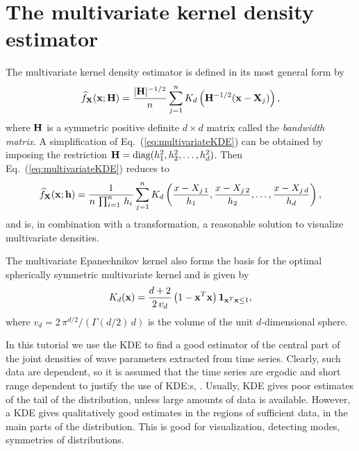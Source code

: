 \section{The multivariate kernel density estimator}
\label{sec:multivariateKDE}
The multivariate kernel density estimator is defined in its most
general form by
\begin{equation}
  \label{eq:multivariateKDE}
  \widehat{f}_{\mathbf{X} }(\mathbf{x} ;\mathbf{H} ) = \frac{|\mathbf{H} |^{-1/2}}{n}
 \sum_{j=1}^{n} K_{d}\left(\mathbf{H} ^{-1/2}(\mathbf{x} -\mathbf{X} _{j})\right),
\end{equation}
where $\mathbf{H} $ is a symmetric positive definite $d \times d$ matrix
called the \textit{bandwidth matrix}. 
A simplification of
Eq.~(\ref{eq:multivariateKDE}) can be obtained by imposing the
restriction $\mathbf{H}  = \text{diag}(h_{1}^{2}, h_{2}^{2}, \ldots ,
h_{d}^{2})$. Then Eq.~(\ref{eq:multivariateKDE}) reduces to
\begin{equation}
  \label{eq:multivariateKDE2}
  \widehat{f}_{\mathbf{X} }(\mathbf{x} ;\mathbf{h} ) =
  \frac{1}{n\,\prod_{i=1}^{n}\,h_{i}}
  \sum_{j=1}^{n} K_{d}\left(\frac{x-X_{j\,1}}{h_{1}},
    \frac{x-X_{j\,2}}{h_{2}},\ldots,
    \frac{x-X_{j\,d}}{h_{d}} \right),
\end{equation}
and is, in combination with a transformation, a reasonable solution
to visualize multivariate densities.

The multivariate Epanechnikov kernel also forms the basis for the
optimal spherically symmetric multivariate kernel
and is given by 
\begin{equation}
  \label{eq:multivariateEpan}
  K_{d}(\mathbf{x} ) = \frac{d+2}{2\,v_{d}}
  \left(1-\mathbf{x} ^{T}\mathbf{x}  \right)\mathbf{1} _{\mathbf{x} ^{T}\mathbf{x} \le 1},
\end{equation}
where $v_{d}=2\,\pi^{d/2}/( \Gamma(d/2) \, d )$ is the volume of the unit
$d$-dimensional sphere.

In this tutorial we use the KDE to find a good estimator of the
central part of
the joint densities of wave parameters extracted from time series.
Clearly, such data are dependent,
so it is assumed that the time series
are ergodic and short range dependent to justify the use of
KDE:s, \citep[see][Chap. 6]{WandAndJones1995Kernel}.
Usually, KDE gives poor estimates of the tail of
the distribution, unless large amounts of data is available. However,
a KDE gives qualitatively good estimates in the regions of sufficient
data, \ie{} in the main parts of the distribution. This is good for
visualization, \eg{} detecting modes, symmetries of distributions.

